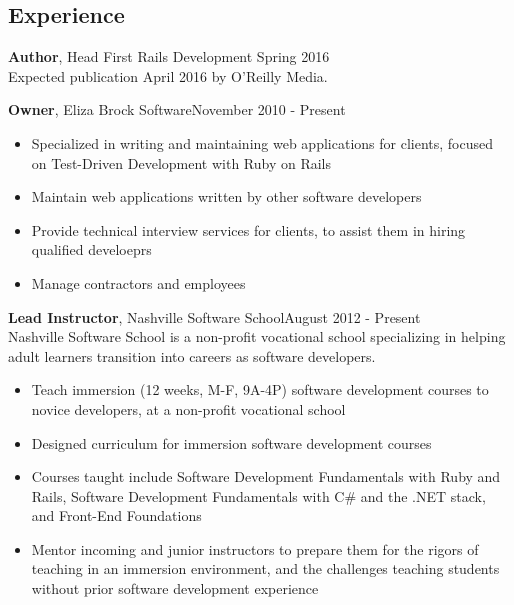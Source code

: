 \documentclass[line, margin, 10pt]{res}
\begin{document}
\renewcommand{\namefont}{ \LARGE \bf }

\address{eliza@elizabrocksoftware.com}
\address{elizabrock.com}

\begin{resume}
\section{Experience}


{\bf Author}, Head First Rails Development \hfill Spring 2016\\
Expected publication April 2016 by O'Reilly Media.

{\bf Owner}, Eliza Brock Software\hfill November 2010 - Present
\begin{itemize} \itemsep -2pt  %
  \item Specialized in writing and maintaining web applications for clients, focused on Test-Driven Development with Ruby on Rails
  \item Maintain web applications written by other software developers
  \item Provide technical interview services for clients, to assist them in hiring qualified develoeprs
  \item Manage contractors and employees
\end{itemize}

{\bf Lead Instructor}, Nashville Software School\hfill August 2012 - Present\\
Nashville Software School is a non-profit vocational school specializing in helping adult learners transition into careers as software developers.
\begin{itemize} \itemsep -2pt  %
  \item Teach immersion (12 weeks, M-F, 9A-4P) software development courses to novice developers, at a non-profit vocational school
  \item Designed curriculum for immersion software development courses
  \item Courses taught include Software Development Fundamentals with Ruby and Rails, Software Development Fundamentals with C\# and the .NET stack, and Front-End Foundations
  \item Mentor incoming and junior instructors to prepare them for the rigors of teaching in an immersion environment, and the challenges teaching students without prior software development experience
\end{itemize}


\end{resume}
\end{document}
